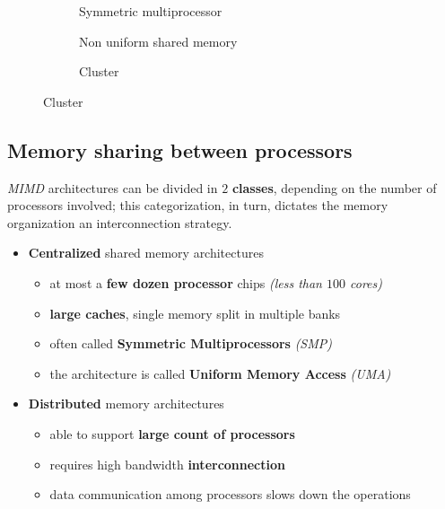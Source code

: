 \documentclass[english]{article}
\begin{document}
\begin{figure}[htbp]
  \begin{subfigure}[b]{0.33\textwidth}
    \bigskip
    \centering
    \caption{Symmetric multiprocessor}
    \label{subfig:symmetric-multiprocessor}
    \bigskip
  \end{subfigure}
  \begin{subfigure}[b]{0.33\textwidth}
    \bigskip
    \centering
    \caption{Non uniform shared memory}
    \label{subfig:non-uniform-shared-memory}
    \bigskip
  \end{subfigure}
  \begin{subfigure}[b]{0.33\textwidth}
    \bigskip
    \centering
    \caption{Cluster}
    \label{subfig:cluster}
    \bigskip
  \end{subfigure}
\end{figure}

\subsection{Memory sharing between processors}

\textit{MIMD} architectures can be divided in \(2\) \textbf{classes}, depending on the number of processors involved;
this categorization, in turn, dictates the memory organization an interconnection strategy.

\begin{itemize}
  \item \textbf{Centralized} shared memory architectures
        \begin{itemize}
          \item at most a \textbf{few dozen processor} chips \textit{(less than \(100\) cores)}
          \item \textbf{large caches}, single memory split in multiple banks
          \item often called \textbf{Symmetric Multiprocessors} \textit{(SMP)}
          \item the architecture is called \textbf{Uniform Memory Access} \textit{(UMA)}
        \end{itemize}
  \item \textbf{Distributed} memory architectures
        \begin{itemize}
          \item able to support \textbf{large count of processors}
          \item requires high bandwidth \textbf{interconnection}
          \item data communication among processors slows down the operations
        \end{itemize}
\end{itemize}
\end{document}
